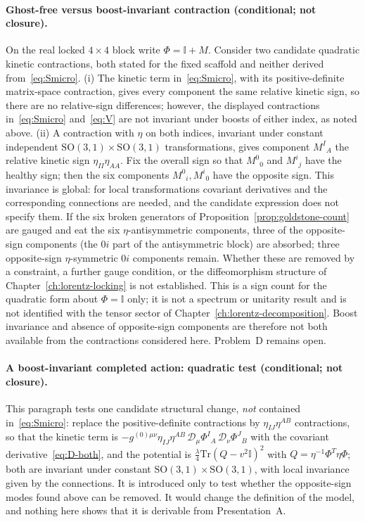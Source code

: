 \paragraph{Ghost-free versus boost-invariant contraction (conditional; not closure).}
On the real locked \(4\times4\) block write \(\Phi=\mathbb{I}+M\). Consider two
candidate quadratic kinetic contractions, both stated for the fixed scaffold
and neither derived from~\eqref{eq:Smicro}.
(i) The kinetic term in~\eqref{eq:Smicro}, with its positive-definite
matrix-space contraction, gives every component the same relative kinetic
sign, so there are no relative-sign differences; however, the displayed
contractions in~\eqref{eq:Smicro} and~\eqref{eq:V} are not invariant under
boosts of either index, as noted above.
(ii) A contraction with \(\eta\) on both indices, invariant under constant
independent \(\mathrm{SO}(3,1)\times\mathrm{SO}(3,1)\) transformations,
gives component \(M^I{}_A\) the relative kinetic sign
\(\eta_{II}\eta_{AA}\). Fix the overall sign so that \(M^0{}_0\) and
\(M^i{}_j\) have the healthy sign; then the six components
\(M^0{}_i,M^i{}_0\) have the opposite sign. This invariance is global: for
local transformations covariant derivatives and the corresponding connections
are needed, and the candidate expression does not specify them. If the six
broken generators of Proposition~\ref{prop:goldstone-count} are gauged and eat
the six \(\eta\)-antisymmetric components, three of the opposite-sign
components (the \(0i\) part of the antisymmetric block) are absorbed; three
opposite-sign \(\eta\)-symmetric \(0i\) components remain. Whether these are
removed by a constraint, a further gauge condition, or the diffeomorphism
structure of Chapter~\ref{ch:lorentz-locking} is not established. This is a
sign count for the quadratic form about \(\Phi=\mathbb{I}\) only; it is not a
spectrum or unitarity result and is not identified with the tensor sector of
Chapter~\ref{ch:lorentz-decomposition}. Boost invariance and absence of
opposite-sign components are therefore not both available from the
contractions considered here. Problem~D remains open.

\paragraph{A boost-invariant completed action: quadratic test (conditional; not closure).}
This paragraph tests one candidate structural change, \emph{not} contained
in~\eqref{eq:Smicro}: replace the positive-definite contractions by
\(\eta_{IJ}\eta^{AB}\) contractions, so that the kinetic term is
\(-g^{(0)\mu\nu}\eta_{IJ}\eta^{AB}\,\mathcal{D}_\mu\Phi^I{}_A\,
\mathcal{D}_\nu\Phi^J{}_B\) with the covariant derivative~\eqref{eq:D-both},
and the potential is \(\tfrac{\lambda}{4}\mathrm{Tr}(Q-v^2\mathbb{I})^2\) with
\(Q=\eta^{-1}\Phi^{T}\eta\Phi\); both are invariant under constant
\(\mathrm{SO}(3,1)\times\mathrm{SO}(3,1)\), with local invariance given by the
connections. It is introduced only to test whether the opposite-sign modes
found above can be removed. It would change the definition of the model, and
nothing here shows that it is derivable from Presentation~A.

